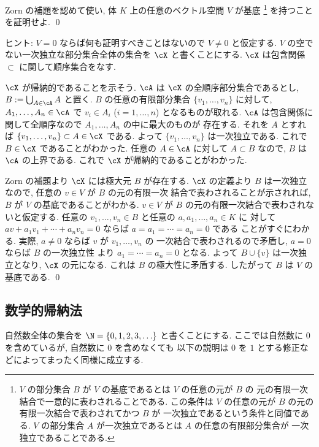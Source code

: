 \documentclass[12pt,twoside]{jarticle}
\begin{document}
\begin{question}
  Zorn の補題を認めて使い, 体 $K$ 上の任意のベクトル空間 $V$ が基底%
  \footnote{$V$ の部分集合 $B$ が $V$ の基底であるとは $V$ の任意の元が $B$ の
    元の有限一次結合で一意的に表わされることである.  
    この条件は $V$ の任意の元が $B$ の元の有限一次結合で表わされてかつ $B$ が
    一次独立であるという条件と同値である.
    $V$ の部分集合 $A$ が一次独立であるとは $A$ の任意の有限部分集合が
    一次独立であることである.}
  を持つことを証明せよ.  \qed
\end{question}

\noindent
ヒント: $V=0$ ならば何も証明すべきことはないので $V\ne 0$ と仮定する.
$V$ の空でない一次独立な部分集合全体の集合を $\cX$ と書くことにする.
$\cX$ は包含関係 $\subset$ に関して順序集合をなす.

$\cX$ が帰納的であることを示そう.
$\cA$ は $\cX$ の全順序部分集合であるとし, $B:=\bigcup_{A\in\cA}A$ と置く.
$B$ の任意の有限部分集合 $\{v_1,\dots,v_n\}$ に対して, $A_1,\dots,A_n\in\cA$ 
で $v_i\in A_i$ ($i=1,\dots,n$) となるものが取れる.
$\cA$ は包含関係に関して全順序なので $A_1,\dots,A_n$ の中に最大のものが
存在する.  それを $A$ とすれば $\{v_1,\dots,v_n\}\subset A\in\cX$ である.
よって $\{v_1,\dots,v_n\}$ は一次独立である.
これで $B\in\cX$ であることがわかった. 
任意の $A\in\cA$ に対して $A\subset B$ なので, $B$ は $\cA$ の上界である.
これで $\cX$ が帰納的であることがわかった.

Zorn の補題より $\cX$ には極大元 $B$ が存在する.
$\cX$ の定義より $B$ は一次独立なので, 任意の $v\in V$ が $B$ の元の有限一次
結合で表わされることが示されれば, $B$ が $V$ の基底であることがわかる.
$v\in V$ が $B$ の元の有限一次結合で表わされないと仮定する.
任意の $v_1,\dots,v_n\in B$ と任意の $a,a_1,\dots,a_n\in K$ に
対して $av+a_1v_1+\cdots+a_nv_n=0$ ならば $a=a_1=\cdots=a_n=0$ である
ことがすぐにわかる.  実際, $a\ne 0$ ならば $v$ が $v_1,\dots,v_n$ の
一次結合で表わされるので矛盾し, $a=0$ ならば $B$ の一次独立性
より $a_1=\cdots=a_n=0$ となる.
よって $B\cup\{v\}$ は一次独立となり, $\cX$ の元になる.
これは $B$ の極大性に矛盾する.
したがって $B$ は $V$ の基底である.
\qed


\subsection{数学的帰納法}
\label{sec:math-induction}

自然数全体の集合を $\N=\{0,1,2,3,\ldots\}$ と書くことにする.
ここでは自然数に $0$ を含めているが, 自然数に $0$ を含めなくても
以下の説明は $0$ を $1$ とする修正などによってまったく同様に成立する.
\end{document}
